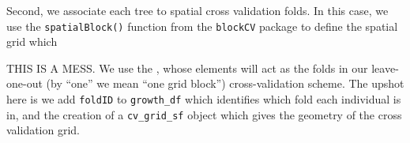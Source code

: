 \documentclass[12pt]{article}
\newenvironment{Shaded}{\begin{snugshade}}{\end{snugshade}}
\newcommand{\CommentTok}[1]{\textcolor[rgb]{0.56,0.35,0.01}{\textit{#1}}}
\newcommand{\DataTypeTok}[1]{\textcolor[rgb]{0.13,0.29,0.53}{#1}}
\newcommand{\DecValTok}[1]{\textcolor[rgb]{0.00,0.00,0.81}{#1}}
\newcommand{\FloatTok}[1]{\textcolor[rgb]{0.00,0.00,0.81}{#1}}
\newcommand{\KeywordTok}[1]{\textcolor[rgb]{0.13,0.29,0.53}{\textbf{#1}}}
\newcommand{\NormalTok}[1]{#1}
\newcommand{\OperatorTok}[1]{\textcolor[rgb]{0.81,0.36,0.00}{\textbf{#1}}}
\newcommand{\OtherTok}[1]{\textcolor[rgb]{0.56,0.35,0.01}{#1}}
\newcommand{\StringTok}[1]{\textcolor[rgb]{0.31,0.60,0.02}{#1}}
\begin{document}
Second, we associate each tree to spatial cross validation folds. In
this case, we use the \texttt{spatialBlock()} function from the
\texttt{blockCV} package to define the spatial grid which

THIS IS A MESS. We use the \citet{valavi_blockcv_2019}, whose elements
will act as the folds in our leave-one-out (by ``one'' we mean ``one
grid block'') cross-validation scheme. The upshot here is we add
\texttt{foldID} to \texttt{growth\_df} which identifies which fold each
individual is in, and the creation of a \texttt{cv\_grid\_sf} object
which gives the geometry of the cross validation grid.

\begin{Shaded}
\end{Shaded}
\end{document}
